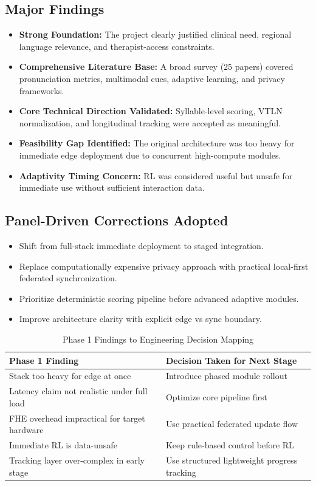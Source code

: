 \documentclass[10pt,a4paper]{article}
\begin{document}
\subsection{Major Findings}
\begin{itemize}
\item \textbf{Strong Foundation:} The project clearly justified clinical need, regional language relevance, and therapist-access constraints.
\item \textbf{Comprehensive Literature Base:} A broad survey (25 papers) covered pronunciation metrics, multimodal cues, adaptive learning, and privacy frameworks.
\item \textbf{Core Technical Direction Validated:} Syllable-level scoring, VTLN normalization, and longitudinal tracking were accepted as meaningful.
\item \textbf{Feasibility Gap Identified:} The original architecture was too heavy for immediate edge deployment due to concurrent high-compute modules.
\item \textbf{Adaptivity Timing Concern:} RL was considered useful but unsafe for immediate use without sufficient interaction data.
\end{itemize}

\subsection{Panel-Driven Corrections Adopted}
\begin{itemize}
\item Shift from full-stack immediate deployment to staged integration.
\item Replace computationally expensive privacy approach with practical local-first federated synchronization.
\item Prioritize deterministic scoring pipeline before advanced adaptive modules.
\item Improve architecture clarity with explicit edge vs sync boundary.
\end{itemize}

\begin{table}[htbp]
\centering
\caption{Phase 1 Findings to Engineering Decision Mapping}
\renewcommand{\arraystretch}{1.2}
\begin{tabularx}{\textwidth}{|p{4cm}|L|}
\hline
\textbf{Phase 1 Finding} & \textbf{Decision Taken for Next Stage} \\
\hline
Stack too heavy for edge at once & Introduce phased module rollout \\
\hline
Latency claim not realistic under full load & Optimize core pipeline first \\
\hline
FHE overhead impractical for target hardware & Use practical federated update flow \\
\hline
Immediate RL is data-unsafe & Keep rule-based control before RL \\
\hline
Tracking layer over-complex in early stage & Use structured lightweight progress tracking \\
\hline
\end{tabularx}
\end{table}
\end{document}
